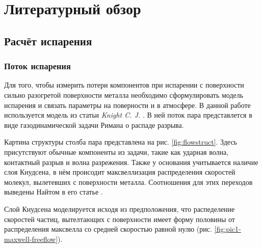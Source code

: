 \section{Литературный обзор}

\subsection{Расчёт испарения}

\subsubsection{Поток испарения}

Для того, чтобы измерить потери компонентов при испарении с поверхности сильно разогретой поверхности металла необходимо сформулировать модель испарения и связать параметры на поверности и в атмосфере. 
В данной работе используется модель из статьи \textit{Knight C. J.} \cite{knight1979theoretical}.
В ней поток пара представлется в виде газодинамической задачи Римана о распаде разрыва.  

Картина структуры столба пара представлена на рис. \ref{fig:flowstruct}. Здесь присутствуют обычные компоненты из задачи, такие как ударная волна, контактный разрыв и волна разрежения. Также у основания учитывается наличие слоя Кнудсена, в нём происодит максвеллизация распределения скоростей молекул, вылетевших с поверхности металла. Соотношения для этих переходов выведены Найтом в его статье \cite{knight1979theoretical}.


Слой Кнудсена моделируется исходя из предположения, что распеделение скоростей частиц, вытелтающих с поверхности имеет форму половины от распределения максвелла со средней скоростью равной нулю (рис. \ref{fig:pic1-maxwell-freeflow}).


\clearpage